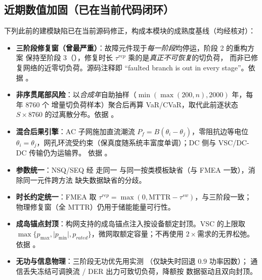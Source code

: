 \subsection{近期数值加固（已在当前代码闭环）}\label{sec:rel-src-hardening}
下列此前的建模缺陷已在当前源码修正，构成本模块的成熟度基线（均经核对）：
\begin{itemize}
 \item \textbf{三阶段修复窗（曾最严重）}：故障元件现于\emph{每一阶段}均停运，阶段 2 的重构方案
 保持至阶段 3（），修复时长 $\tau^{rep}$ 乘的是\emph{真正不可恢复}的切负荷，
 而非已修复网络的近零切负荷。源码注释即 “faulted branch is out in every stage”。依据
 。
 \item \textbf{非序贯尾部风险}：以\emph{合成年}自助抽样（$\min(\max(200,n),2000)$ 年，每年 8760 个
 增量切负荷样本）聚合后再算 VaR/CVaR，取代此前逐状态 $S\times8760$ 的过离散分布。依据
 。
 \item \textbf{混合后果引擎}：AC 子网施加直流潮流 $P_f=B(\theta_i-\theta_j)$，零阻抗边等电位
 $\theta_i=\theta_j$，网孔环流受约束（保真度随系统丰富度单调）；DC 侧与 VSC/DC-DC 传输仍为运输界。
 依据 。
 \item \textbf{参数统一}：NSQ/SEQ 经 
 走同一  与同一按类模板缺省（与 FMEA 一致），消除同一元件跨方法
 缺失数据缺省的分歧。
 \item \textbf{时长约定统一}：FMEA 取 $\tau^{rep}=\max(0,\mathrm{MTTR}-\tau^{sw})$，与三阶段一致；
 物理修复窗（全 MTTR）仍用于储能能量可行性。
 \item \textbf{成岛锚点封顶}：构网支持的成岛锚点注入按设备额定封顶。VSC 的上限取
 $\max\{p_{\max},\lvert p_{\min}\rvert,p_{rated}\}$，微网取额定容量；不再使用 $2\times$需求的无界松弛。依据
 。
 \item \textbf{无功与信息物理}：三阶段无功优先用实测 （仅缺失时回退 $0.9$ 功率因数）；
 通信丢失冻结可调换流 / DER 出力可致切负荷，降额按  数据驱动且双向封顶。
\end{itemize}

